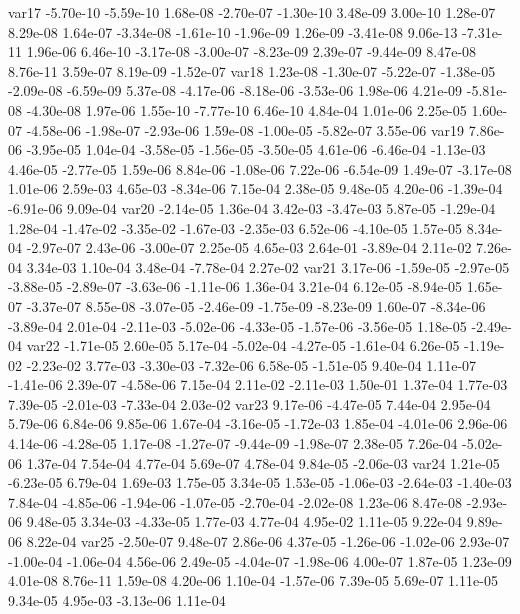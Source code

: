 var17 -5.70e-10 -5.59e-10  1.68e-08 -2.70e-07 -1.30e-10  3.48e-09  3.00e-10  1.28e-07  8.29e-08  1.64e-07 -3.34e-08 -1.61e-10 -1.96e-09  1.26e-09 -3.41e-08  9.06e-13 -7.31e-11  1.96e-06  6.46e-10 -3.17e-08 -3.00e-07 -8.23e-09  2.39e-07 -9.44e-09  8.47e-08  8.76e-11  3.59e-07  8.19e-09 -1.52e-07
var18  1.23e-08 -1.30e-07 -5.22e-07 -1.38e-05 -2.09e-08 -6.59e-09  5.37e-08 -4.17e-06 -8.18e-06 -3.53e-06  1.98e-06  4.21e-09 -5.81e-08 -4.30e-08  1.97e-06  1.55e-10 -7.77e-10  6.46e-10  4.84e-04  1.01e-06  2.25e-05  1.60e-07 -4.58e-06 -1.98e-07 -2.93e-06  1.59e-08 -1.00e-05 -5.82e-07  3.55e-06
var19  7.86e-06 -3.95e-05  1.04e-04 -3.58e-05 -1.56e-05 -3.50e-05  4.61e-06 -6.46e-04 -1.13e-03  4.46e-05 -2.77e-05  1.59e-06  8.84e-06 -1.08e-06  7.22e-06 -6.54e-09  1.49e-07 -3.17e-08  1.01e-06  2.59e-03  4.65e-03 -8.34e-06  7.15e-04  2.38e-05  9.48e-05  4.20e-06 -1.39e-04 -6.91e-06  9.09e-04
var20 -2.14e-05  1.36e-04  3.42e-03 -3.47e-03  5.87e-05 -1.29e-04  1.28e-04 -1.47e-02 -3.35e-02 -1.67e-03 -2.35e-03  6.52e-06 -4.10e-05  1.57e-05  8.34e-04 -2.97e-07  2.43e-06 -3.00e-07  2.25e-05  4.65e-03  2.64e-01 -3.89e-04  2.11e-02  7.26e-04  3.34e-03  1.10e-04  3.48e-04 -7.78e-04  2.27e-02
var21  3.17e-06 -1.59e-05 -2.97e-05 -3.88e-05 -2.89e-07 -3.63e-06 -1.11e-06  1.36e-04  3.21e-04  6.12e-05 -8.94e-05  1.65e-07 -3.37e-07  8.55e-08 -3.07e-05 -2.46e-09 -1.75e-09 -8.23e-09  1.60e-07 -8.34e-06 -3.89e-04  2.01e-04 -2.11e-03 -5.02e-06 -4.33e-05 -1.57e-06 -3.56e-05  1.18e-05 -2.49e-04
var22 -1.71e-05  2.60e-05  5.17e-04 -5.02e-04 -4.27e-05 -1.61e-04  6.26e-05 -1.19e-02 -2.23e-02  3.77e-03 -3.30e-03 -7.32e-06  6.58e-05 -1.51e-05  9.40e-04  1.11e-07 -1.41e-06  2.39e-07 -4.58e-06  7.15e-04  2.11e-02 -2.11e-03  1.50e-01  1.37e-04  1.77e-03  7.39e-05 -2.01e-03 -7.33e-04  2.03e-02
var23  9.17e-06 -4.47e-05  7.44e-04  2.95e-04  5.79e-06  6.84e-06  9.85e-06  1.67e-04 -3.16e-05 -1.72e-03  1.85e-04 -4.01e-06  2.96e-06  4.14e-06 -4.28e-05  1.17e-08 -1.27e-07 -9.44e-09 -1.98e-07  2.38e-05  7.26e-04 -5.02e-06  1.37e-04  7.54e-04  4.77e-04  5.69e-07  4.78e-04  9.84e-05 -2.06e-03
var24  1.21e-05 -6.23e-05  6.79e-04  1.69e-03  1.75e-05  3.34e-05  1.53e-05 -1.06e-03 -2.64e-03 -1.40e-03  7.84e-04 -4.85e-06 -1.94e-06 -1.07e-05 -2.70e-04 -2.02e-08  1.23e-06  8.47e-08 -2.93e-06  9.48e-05  3.34e-03 -4.33e-05  1.77e-03  4.77e-04  4.95e-02  1.11e-05  9.22e-04  9.89e-06  8.22e-04
var25 -2.50e-07  9.48e-07  2.86e-06  4.37e-05 -1.26e-06 -1.02e-06  2.93e-07 -1.00e-04 -1.06e-04  4.56e-06  2.49e-05 -4.04e-07 -1.98e-06  4.00e-07  1.87e-05  1.23e-09  4.01e-08  8.76e-11  1.59e-08  4.20e-06  1.10e-04 -1.57e-06  7.39e-05  5.69e-07  1.11e-05  9.34e-05  4.95e-03 -3.13e-06  1.11e-04
